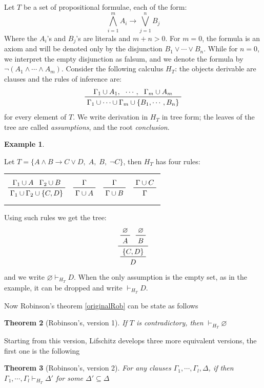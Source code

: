 \documentclass[a4paper,12pt,oneside]{book}
\newtheorem{theorem}{Theorem}[chapter]
\newtheorem{example}[theorem]{Example}
\let\emptyset\varnothing
\let\o\vee
\let\e\wedge
\begin{document}
Let $T$ be a set of propositional formulae, each of the form:
\begin{equation}\label{prototipo}
\bigwedge_{i=1}^m A_i \rightarrow \bigvee_{j=1}^n B_j 
\end{equation}
Where the $A_i$'s and $B_j$'s are literals and $m+n>0$. For $m=0$, the formula is an axiom and will be denoted only by the disjunction $B_1\o\cdots\o B_n$. While for $n=0$, we interpret the empty disjunction as falsum, and we denote the formula by $\neg (A_1\e\cdots\e A_m)$.
Consider the following calculus $H_T$: the objects derivable are clauses and the rules of inference are:
\begin{equation}\label{axiom}
\prftree{\Gamma_1 \cup A_1 ,} {\cdots,} {\Gamma_m \cup A_m } 
{\Gamma_1\cup\cdots\cup\Gamma_m\cup\{ B_1 ,\cdots ,B_n\}}
\end{equation}
for every element of $T$. We write derivation in $H_T$ in tree form; the leaves of the tree are called \textit{assumptions}, and the root \textit{conclusion}.


\noindent\begin{example}
\end{example} Let $T=\{ A \e B \rightarrow C \o D ,\; A,\; B,\; \neg C \}$, then $H_T$ has four rules:

\begin{center}
\begin{tabular}{cccc}
$$\prftree{\Gamma_1 \cup A } {\Gamma_2\cup B} {\Gamma_1\cup\Gamma_2\cup \{C,D\}} 
$$
& \hspace{5mm}
$$\prftree{\Gamma }  {\Gamma\cup A} 
$$
& \hspace{5mm}
$$\prftree{\Gamma }  {\Gamma\cup B} 
$$
& \hspace{5mm}
$$\prftree{\Gamma \cup C }  {\Gamma }
$$
\end{tabular}
\end{center}
Using such rules we get the tree:
$$
\prftree{\prftree{\emptyset}{A}}{\prftree{\emptyset}{B}}
{\prftree{\{C , D\}}{D}}
$$
and we write $\emptyset \vdash_{H_T} D$.  When the only assumption is the empty set, as in the example, it can be dropped and write $\vdash_{H_T} D$.

Now Robinson's theorem \ref{originalRob} can be state as follows
\begin{theorem}[Robinson's, version 1]
If $T$ is contradictory, then $\vdash_{H_T} \emptyset$
\end{theorem}
\noindent Starting from this version, Lifschitz develops three more equivalent versions, the first one is the following
\begin{theorem}[Robinson's, version 2]\label{robinson2}
For any clauses $\Gamma_1,\cdots,\Gamma_l,\Delta$, 
if  then $\Gamma_1,\cdots ,\Gamma_l\vdash_{H_T} \Delta'$ for some $\Delta'\subseteq\Delta$
\end{theorem}
\end{document}
